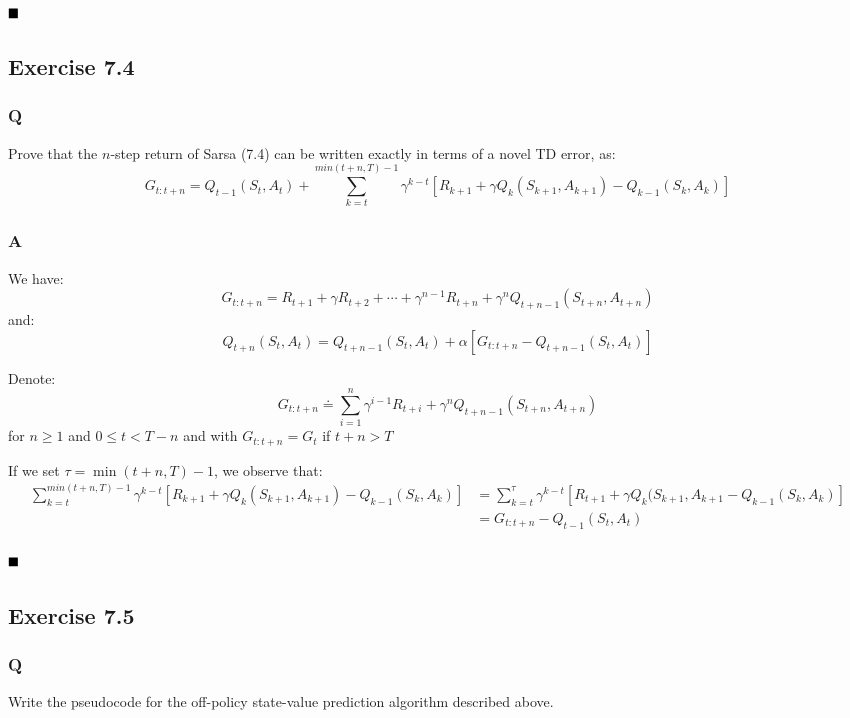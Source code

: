 $
\hfill \blacksquare
$

\subsection{Exercise 7.4}
\subsubsection{Q}
Prove that the $n$-step return of Sarsa (7.4) can be written exactly in terms of a novel TD error, as:
\begin{equation}
G_{t:t+n} = Q_{t-1}(S_t, A_t) + \sum_{k=t}^{min(t+n, T)-1} \gamma^{k-t}\left[R_{k+1} + \gamma Q_k(S_{k+1}, A_{k+1}) - Q_{k-1}(S_k, A_k) \right]
\end{equation}
\subsubsection{A}
We have:
\begin{equation}
G_{t:t+n} = R_{t+1} + \gamma R_{t+2} + \cdots + \gamma^{n-1}R_{t+n} + \gamma^n Q_{t+n-1}(S_{t+n}, A_{t+n})
\end{equation}
and:
\begin{equation}
Q_{t+n}(S_t, A_t) = Q_{t+n-1}(S_t, A_t) + \alpha \left[G_{t:t+n} - Q_{t+n-1}(S_t, A_t)\right]
\end{equation}

Denote:
\begin{equation}
G_{t:t+n} \doteq \sum_{i=1}^{n} \gamma^{i-1} R_{t+i} + \gamma^n Q_{t+n-1}(S_{t+n}, A_{t+n})
\end{equation}
for $n \geq 1$ and $0 \leq t < T - n$ and with $G_{t:t+n} = G_t$ if $t+n > T$

If we set $\tau = \min (t+n, T) - 1$, we observe that:
\begin{align}
\sum_{k=t}^{min(t+n, T)-1} \gamma^{k-t}\left[R_{k+1} + \gamma Q_k(S_{k+1}, A_{k+1}) - Q_{k-1}(S_k, A_k) \right] &= \sum_{k=t}^{\tau}\gamma^{k-t}\left[R_{t+1} + \gamma Q_k(S_{k+1}, A_{k+1} - Q_{k-1}(S_k, A_k)\right] \\
&= G_{t:t+n} - Q_{t-1}(S_t, A_t) \\
\end{align}

$
\hfill \blacksquare
$

\subsection{Exercise 7.5}
\subsubsection{Q}
Write the pseudocode for the off-policy state-value prediction algorithm described above.
